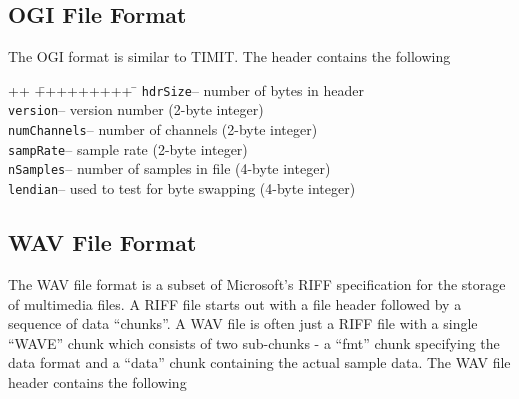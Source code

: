 \subsection{OGI File Format}

The OGI format is similar to TIMIT. The header contains the following

\begin{tabbing}
++ \= +++++++++ \= \kill
\>\texttt{hdrSize}\>-- number of bytes in header \\
\>\texttt{version}\>-- version number (2-byte integer) \\
\>\texttt{numChannels}\>-- number of channels (2-byte integer) \\
\>\texttt{sampRate}\>-- sample rate (2-byte integer) \\
\>\texttt{nSamples}\>-- number of samples in file (4-byte integer) \\
\>\texttt{lendian}\>-- used to test for byte swapping (4-byte integer) 
\end{tabbing}

\subsection{WAV File Format}{}

The WAV file format is a subset of Microsoft's RIFF specification for the
storage of multimedia files. A RIFF file starts out with a file header followed
by a sequence of data ``chunks''. A WAV file is often just a RIFF file with a
single ``WAVE'' chunk which consists of two sub-chunks - a ``fmt'' chunk
specifying the data format and a ``data'' chunk containing the actual sample
data. The WAV file header contains the following

